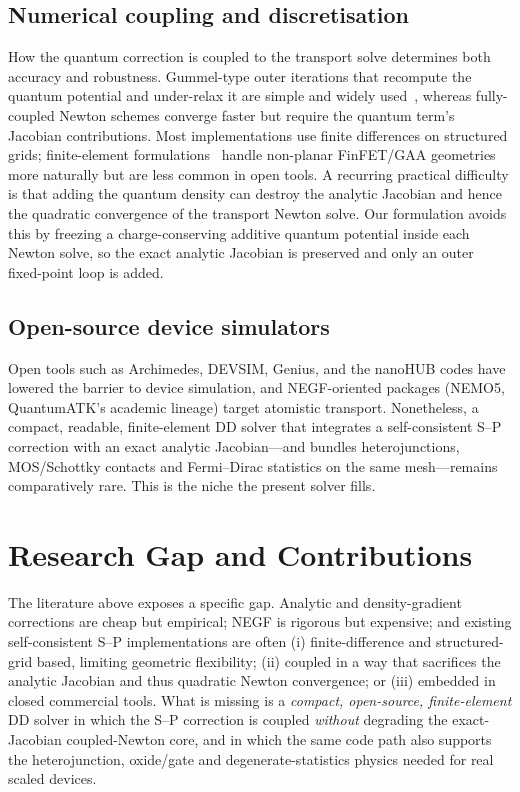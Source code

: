 \documentclass[conference]{IEEEtran}
\begin{document}
\subsection{Numerical coupling and discretisation}
How the quantum correction is coupled to the transport solve determines both
accuracy and robustness. Gummel-type outer iterations that recompute the quantum
potential and under-relax it are simple and widely used~\cite{trellakis}, whereas
fully-coupled Newton schemes converge faster but require the quantum term's
Jacobian contributions. Most implementations use finite differences on structured
grids; finite-element formulations~\cite{vasileska} handle non-planar
FinFET/GAA geometries more naturally but are less common in open tools. A recurring
practical difficulty is that adding the quantum density can destroy the analytic
Jacobian and hence the quadratic convergence of the transport Newton solve. Our
formulation avoids this by freezing a charge-conserving additive quantum potential
inside each Newton solve, so the exact analytic Jacobian is preserved and only an
outer fixed-point loop is added.

\subsection{Open-source device simulators}
Open tools such as Archimedes, DEVSIM, Genius, and the nanoHUB codes have lowered
the barrier to device simulation, and NEGF-oriented packages (NEMO5, QuantumATK's
academic lineage) target atomistic transport. Nonetheless, a compact,
readable, finite-element DD solver that integrates a self-consistent S--P
correction with an exact analytic Jacobian---and bundles heterojunctions,
MOS/Schottky contacts and Fermi--Dirac statistics on the same mesh---remains
comparatively rare. This is the niche the present solver fills.

\section{Research Gap and Contributions}
\label{sec:gap}
The literature above exposes a specific gap. Analytic and density-gradient
corrections are cheap but empirical; NEGF is rigorous but expensive; and existing
self-consistent S--P implementations are often (i) finite-difference and
structured-grid based, limiting geometric flexibility; (ii) coupled in a way that
sacrifices the analytic Jacobian and thus quadratic Newton convergence; or (iii)
embedded in closed commercial tools. What is missing is a \emph{compact,
open-source, finite-element} DD solver in which the S--P correction is coupled
\emph{without} degrading the exact-Jacobian coupled-Newton core, and in which the
same code path also supports the heterojunction, oxide/gate and degenerate-statistics
physics needed for real scaled devices.
\end{document}

